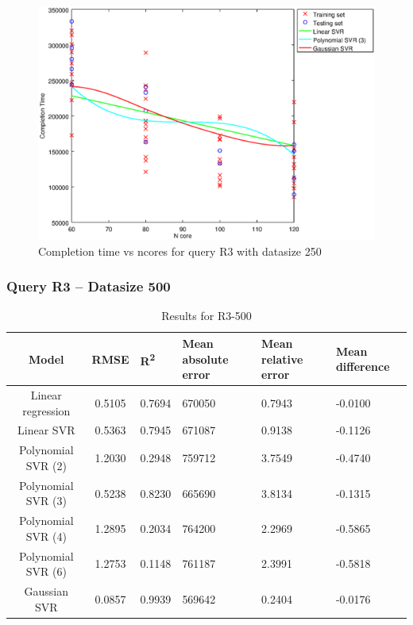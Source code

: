 \documentclass[a4paper,11pt]{article}
\begin{document}
\begin {figure}[hbtp]
\centering
\includegraphics[width=\textwidth]{output/R3_250_ONLY_1_LINEAR_NCORE/plot_R3_250_bestmodels.eps}
\caption{Completion time vs ncores for query R3 with datasize 250}
\label{fig:coreonly_linear_R3_250}
\end {figure}

\newpage
\subsubsection{Query R3 -- Datasize 500}
\begin{table}[H]
	\centering
	\begin{adjustbox}{center}
		\begin{tabular}{c | c M{1.2cm} M{2.5cm} M{2.5cm} M{1.8cm}}
			Model & RMSE & R\textsuperscript{2} & Mean absolute error & Mean relative error & Mean difference \tabularnewline
			\hline
			Linear regression & 0.5105 & 0.7694 & 670050 & 0.7943 & -0.0100 \\
			Linear SVR & 0.5363 & 0.7945 & 671087 & 0.9138 & -0.1126 \\
			Polynomial SVR (2) & 1.2030 & 0.2948 & 759712 & 3.7549 & -0.4740 \\
			Polynomial SVR (3) & 0.5238 & 0.8230 & 665690 & 3.8134 & -0.1315 \\
			Polynomial SVR (4) & 1.2895 & 0.2034 & 764200 & 2.2969 & -0.5865 \\
			Polynomial SVR (6) & 1.2753 & 0.1148 & 761187 & 2.3991 & -0.5818 \\
			Gaussian SVR & 0.0857 & 0.9939 & 569642 & 0.2404 & -0.0176 \\
		\end{tabular}
	\end{adjustbox}
	\\
	\caption{Results for R3-500}
	\label{fig:coreonly_linear_R3_500}
\end{table}
\end{document}
